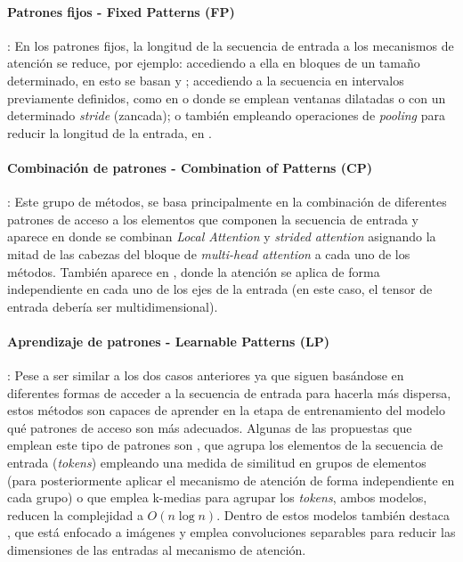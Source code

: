 \paragraph{Patrones fijos - Fixed Patterns (FP)}:
En los patrones fijos, la longitud de la secuencia de entrada a los mecanismos de atención se reduce, por ejemplo: accediendo a ella en bloques de un tamaño determinado, en esto se basan  \cite{qiu-etal-2020-blockwise} y  \cite{localattention}; accediendo a la secuencia en intervalos previamente definidos, como en  \cite{sparse-transformers} o  \cite{beltagy2020longformer} donde se emplean ventanas dilatadas o con un determinado \textit{stride} (zancada); o también empleando operaciones de \textit{pooling} para reducir la longitud de la entrada, en  \cite{j.2018generating}.

\paragraph{Combinación de patrones - Combination of Patterns (CP)}:
Este grupo de métodos, se basa principalmente en la combinación de diferentes patrones de acceso a los elementos que componen la secuencia de entrada y aparece en  \cite{sparse-transformers} donde se combinan \textit{Local Attention} y \textit{strided attention} asignando la mitad de las cabezas del bloque de \textit{multi-head attention} a cada uno de los métodos. También aparece en  \cite{ho2019axial}, donde la atención se aplica de forma independiente en cada uno de los ejes de la entrada (en este caso, el tensor de entrada debería ser multidimensional).

\paragraph{Aprendizaje de patrones - Learnable Patterns (LP)}:
Pese a ser similar a los dos casos anteriores ya que siguen basándose en diferentes formas de acceder a la secuencia de entrada para hacerla más dispersa, estos métodos son capaces de aprender en la etapa de entrenamiento del modelo qué patrones de acceso son más adecuados. Algunas de las propuestas que emplean este tipo de patrones son  \cite{Kitaev2020Reformer:}, que agrupa los elementos de la secuencia de entrada (\textit{tokens}) empleando una medida de similitud en grupos de elementos (para posteriormente aplicar el mecanismo de atención de forma independiente en cada grupo) o  \cite{routingtransformer} que emplea k-medias para agrupar los \textit{tokens}, ambos modelos, reducen la complejidad a $O(n \log n)$. Dentro de estos modelos también destaca  \cite{zhql2021ResT}, que está enfocado a imágenes y emplea convoluciones separables para reducir las dimensiones de las entradas al mecanismo de atención.

